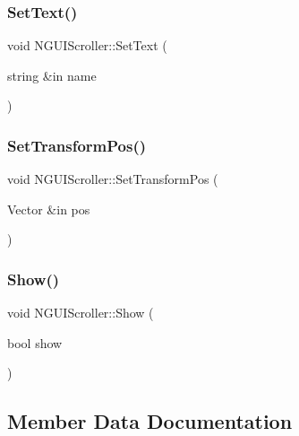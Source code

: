 \subsubsection{\texorpdfstring{Set\+Text()}{SetText()}}
{\footnotesize\ttfamily void N\+G\+U\+I\+Scroller\+::\+Set\+Text (\begin{DoxyParamCaption}\item[{string \&in}]{name }\end{DoxyParamCaption})}

\hypertarget{class_n_g_u_i_scroller_a041cefceab0625ea53b86ed5715621a4}{}\label{class_n_g_u_i_scroller_a041cefceab0625ea53b86ed5715621a4} 
\subsubsection{\texorpdfstring{Set\+Transform\+Pos()}{SetTransformPos()}}
{\footnotesize\ttfamily void N\+G\+U\+I\+Scroller\+::\+Set\+Transform\+Pos (\begin{DoxyParamCaption}\item[{Vector \&in}]{pos }\end{DoxyParamCaption})}

\hypertarget{class_n_g_u_i_scroller_a49a2391abc2f43a8b0a93b88d304747e}{}\label{class_n_g_u_i_scroller_a49a2391abc2f43a8b0a93b88d304747e} 
\subsubsection{\texorpdfstring{Show()}{Show()}}
{\footnotesize\ttfamily void N\+G\+U\+I\+Scroller\+::\+Show (\begin{DoxyParamCaption}\item[{bool}]{show }\end{DoxyParamCaption})}



\subsection{Member Data Documentation}
\hypertarget{class_n_g_u_i_scroller_a5a0b48b13a2732500028534c5717b47e}{}\label{class_n_g_u_i_scroller_a5a0b48b13a2732500028534c5717b47e} 
